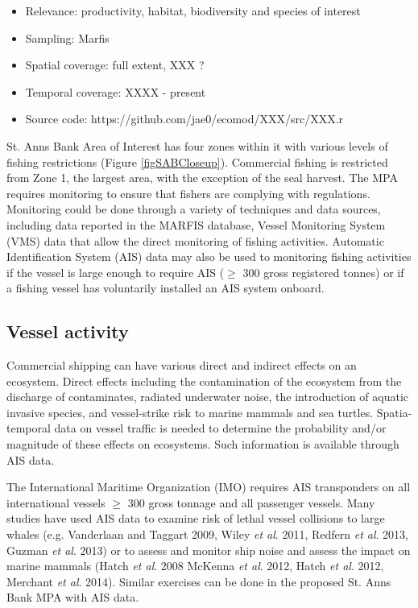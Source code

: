 \documentclass[letterpaper,portrait,11pt]{scrartcl}
\numberwithin{equation}{section}		%
\numberwithin{figure}{section}			%
\numberwithin{table}{section}				%
\begin{document}
\begin{itemize*}
\begin{itemize}
  \item Relevance:  productivity, habitat, biodiversity and species of interest
  \item Sampling:  Marfis
  \item Spatial coverage: full extent, XXX ?
  \item Temporal coverage: XXXX - present
  \item Source code: https://github.com/jae0/ecomod/XXX/src/XXX.r
\end{itemize}	




St. Anns Bank Area of Interest has four zones within it with various levels of fishing restrictions (Figure \ref{figSABCloseup}). Commercial fishing is restricted from Zone 1, the largest area, with the exception of the seal harvest.  The MPA requires monitoring to ensure that fishers are complying with regulations.  Monitoring could be done through a variety of techniques and data sources, including data reported in the MARFIS database, Vessel Monitoring System (VMS) data that allow the direct monitoring of fishing activities. Automatic Identification System (AIS) data may also be used to monitoring fishing activities if the vessel is large enough to require AIS ($\geq$ 300 gross registered tonnes) or if a fishing vessel has voluntarily installed an AIS system onboard.  




\subsection{Vessel activity}
Commercial shipping can have various direct and indirect effects on an ecosystem. Direct effects including the contamination of the ecosystem from the discharge of contaminates, radiated underwater noise, the introduction of aquatic invasive species, and vessel-strike risk to marine mammals and sea turtles.  Spatia-temporal data on vessel traffic is needed to determine the probability and/or magnitude of these effects on ecosystems.  Such information is available through AIS data.  

The International Maritime Organization (IMO) requires AIS transponders on all international vessels $\geq$ 300 gross tonnage and all passenger vessels.  Many studies have used AIS data to examine risk of lethal vessel collisions to large whales (e.g. Vanderlaan and Taggart 2009, Wiley \textit{et al}. 2011, Redfern \textit{et al}. 2013,  Guzman \textit{et al}. 2013) or to assess and monitor ship noise and assess the impact on marine mammals (Hatch \textit{et al}. 2008 McKenna \textit{et al}. 2012,  Hatch \textit{et al}. 2012, Merchant \textit{et al}. 2014).    Similar exercises can be done in the proposed St. Anns Bank MPA with AIS data. 


\end{itemize*}
\end{document}
